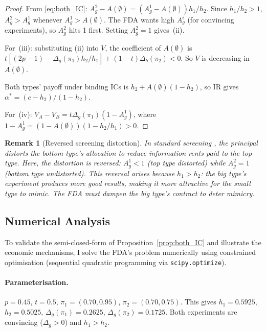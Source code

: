 \documentclass[12pt,a4paper]{article}
\newtheorem{remark}{Remark}
\begin{document}
\begin{proof}
From \eqref{eq:both_IC}: $A_g^2 - A(\emptyset) =
(A_g^1 - A(\emptyset)) h_1/h_2$. Since $h_1/h_2 > 1$,
$A_g^2 > A_g^1$ whenever $A_g^1 > A(\emptyset)$. The FDA
wants high $A_g^i$ (for convincing experiments), so
$A_g^2$ hits 1 first. Setting $A_g^2 = 1$ gives~(ii).

For~(iii): substituting (ii) into $V$, the coefficient of
$A(\emptyset)$ is
$t[(2p-1) - \Delta_g(\pi_1) h_2/h_1] + (1-t)\Delta_b(\pi_2)
< 0$.
So $V$ is decreasing in $A(\emptyset)$.

Both types' payoff under binding ICs is
$h_2 + A(\emptyset)(1-h_2)$, so IR gives
$\alpha^* = (c - h_2)/(1-h_2)$.

For~(iv): $V_A - V_B = t \Delta_g(\pi_1)(1 - A_g^1)$, where
$1 - A_g^1 = (1 - A(\emptyset))(1 - h_2/h_1) > 0$.
\end{proof}

\begin{remark}[Reversed screening distortion]
In standard screening \citep{maskinriley1984}, the principal
distorts the \emph{bottom type's} allocation to reduce
information rents paid to the top type. Here, the distortion
is reversed: $A_g^1 < 1$ (top type distorted) while
$A_g^2 = 1$ (bottom type undistorted). This reversal arises
because $h_1 > h_2$: the big type's experiment produces more
good results, making it \emph{more attractive} for the small
type to mimic. The FDA must dampen the big type's contract to
deter mimicry.
\end{remark}


\subsection{Numerical Analysis}
\label{sec:numerical}

To validate the semi-closed-form of
Proposition~\ref{prop:both_IC} and illustrate the economic
mechanisms, I solve the FDA's problem numerically using
constrained optimisation (sequential quadratic
programming via \texttt{scipy.optimize}).

\paragraph{Parameterisation.}
$p = 0.45$, $t = 0.5$,
$\pi_1 = (0.70, 0.95)$, $\pi_2 = (0.70, 0.75)$.
This gives $h_1 = 0.5925$, $h_2 = 0.5025$,
$\Delta_g(\pi_1) = 0.2625$, $\Delta_g(\pi_2) = 0.1725$.
Both experiments are convincing ($\Delta_g > 0$) and
$h_1 > h_2$.
\end{document}
